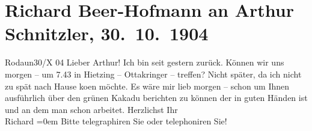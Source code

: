 

         \renewcommand{\erwaehnteOrte}{Orte: Ottakringer Bräu, Rodaun, Wien, XIII., Hietzing}
         \renewcommand{\erwaehnteWerke}{Werke: Der grüne Kakadu. Groteske in einem Akt}
               \section[Richard Beer-Hofmann an Arthur Schnitzler, 30. 10. 1904]{ Richard Beer-Hofmann an Arthur Schnitzler,
               30. 10. 1904}\nopagebreak{}\rehead{ }\begin{ledgroupsized}[t]{13cm}\normalsize\beginnumbering \toendnotes[C]{\smallbreak\pagebreak[2]} 
\toendnotes[C]{\smallbreak}\pstart
           \raggedleft{}{\pb}Rodaun30/X 04\pend
           \pstart
           Lieber Arthur! Ich bin seit gestern zurück. Können wir uns morgen –
                  \label{K_L01462_1v}\label{K_L01462_1h} um 7.43 in Hietzing – Ottakringer –
               treffen? Nicht später, da ich nicht zu spät nach Hause ko{\geminationm}en möchte. Es wäre mir lieb morgen – schon um Ihnen ausführlich über den grünen Kakadu berichten zu können der in guten
               Händen ist und an dem man schon arbeitet.\pend
           \pstart
           Herzlichst Ihr{\\[\baselineskip]}\spacefill\mbox{Richard}\pend
           \leftskip=0em{}\pstart
           \noindent{}Bitte telegraphiren Sie oder telephoniren Sie!\pend
           
         
         \endnumbering{}\end{ledgroupsized}  \newcommand{\dateiname}{L01462}\newcommand{\titel}{Richard Beer-Hofmann an Arthur Schnitzler, 30. 10. 1904}\newcommand{\editorInnen}{Martin Anton Müller und Gerd-Hermann Susen}
      